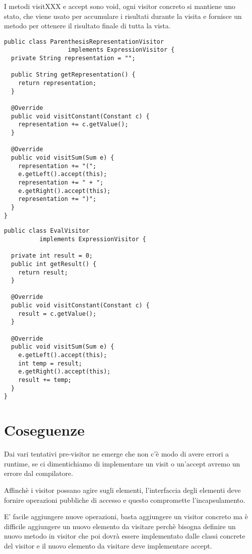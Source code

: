I metodi visitXXX e accept sono void, ogni visitor concreto si mantiene uno stato, che viene usato per accumulare i risultati durante la visita e fornisce
un metodo per ottenere il risultato finale di tutta la vista.
\begin{multicols}{2}
\begin{lstlisting}
public class ParenthesisRepresentationVisitor 
                  implements ExpressionVisitor {
  private String representation = "";
  
  public String getRepresentation() {
    return representation;
  }

  @Override
  public void visitConstant(Constant c) {
    representation += c.getValue();
  }

  @Override
  public void visitSum(Sum e) {
    representation += "(";
    e.getLeft().accept(this);
    representation += " + ";
    e.getRight().accept(this);
    representation += ")";
  }
}
\end{lstlisting}
\columnbreak
\begin{lstlisting}
public class EvalVisitor 
          implements ExpressionVisitor {
  
  private int result = 0;
  public int getResult() {
    return result;
  }

  @Override
  public void visitConstant(Constant c) {
    result = c.getValue();
  }

  @Override
  public void visitSum(Sum e) {
    e.getLeft().accept(this);
    int temp = result;
    e.getRight().accept(this);
    result += temp;
  }
} 
\end{lstlisting}
\end{multicols}
\section{Coseguenze}

Dai vari tentativi pre-visitor ne emerge che non c’è modo di avere errori a runtime, se ci dimentichiamo di implementare un visit o un’accept avremo un errore 
dal compilatore.
\smallskip

Affinchè i visitor possano agire sugli elementi, l'interfaccia degli elementi deve fornire operazioni pubbliche di accesso e questo compromette l'incapsulamento.

E' facile aggiungere nuove operazioni, basta aggiungere un visitor concreto ma è difficile aggiungere un nuovo elemento da visitare perchè bisogna definire un nuovo 
metodo in visitor che poi dovrà essere implementato dalle classi concrete del visitor e il nuovo elemento da visitare deve implementare accept.

